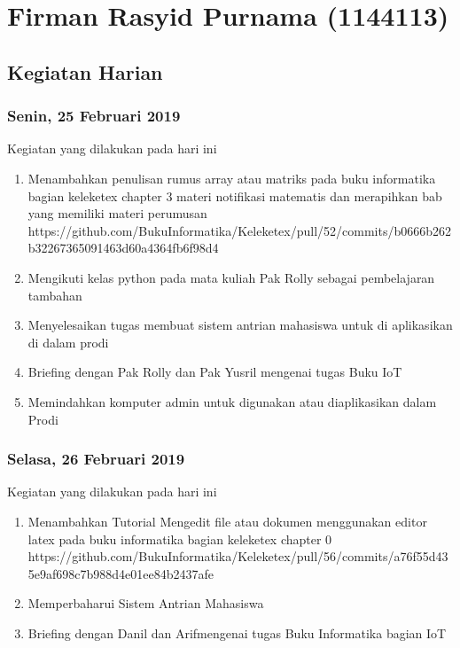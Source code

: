 \chapter{Firman Rasyid Purnama (1144113)}

\section{Kegiatan Harian}

\subsection{Senin, 25 Februari 2019}
Kegiatan yang dilakukan pada hari ini
\begin{enumerate}
\item Menambahkan penulisan rumus array atau matriks pada buku informatika bagian keleketex chapter 3 materi notifikasi matematis dan merapihkan bab yang memiliki materi perumusan
\subitem https://github.com/BukuInformatika/Keleketex/pull/52/commits/b0666b262b32267365091463d60a4364fb6f98d4
\item Mengikuti kelas python pada mata kuliah Pak Rolly sebagai pembelajaran tambahan
\item Menyelesaikan tugas membuat sistem antrian mahasiswa untuk di aplikasikan di dalam prodi
\item Briefing dengan Pak Rolly dan Pak Yusril mengenai tugas Buku IoT
\item Memindahkan komputer admin untuk digunakan atau diaplikasikan dalam Prodi
\end{enumerate}

\subsection{Selasa, 26 Februari 2019}
Kegiatan yang dilakukan pada hari ini
\begin{enumerate}
\item Menambahkan Tutorial Mengedit file atau dokumen menggunakan editor latex pada buku informatika bagian keleketex chapter 0
\subitem https://github.com/BukuInformatika/Keleketex/pull/56/commits/a76f55d435e9af698c7b988d4e01ee84b2437afe
\item Memperbaharui Sistem Antrian Mahasiswa
\item Briefing dengan Danil dan Arifmengenai tugas Buku Informatika bagian IoT
\end{enumerate}





